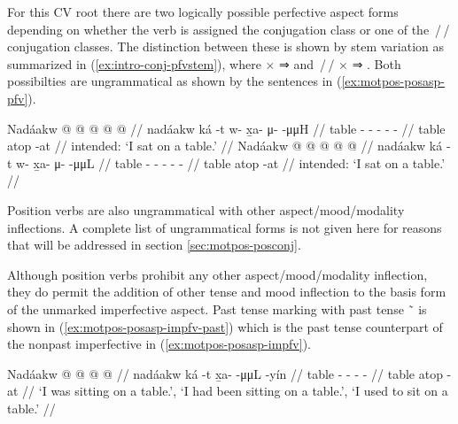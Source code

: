 \documentclass[12pt,letterpaper,oneside,article]{memoir}
\begin{document}
For this CV root there are two logically possible perfective aspect forms depending on whether the verb is assigned the  conjugation class or one of the \,/\,/ conjugation classes.
The distinction between these is shown by stem variation as summarized in (\ref{ex:intro-conj-pfvstem}), where  ×  ⇒  and \,/\,/ ×  ⇒ .
Both possibilties are ungrammatical as shown by the sentences in (\ref{ex:motpos-posasp-pfv}).

\pex\label{ex:motpos-posasp-pfv}%
\a\label{ex:motpos-posasp-pfv-nonz}%
\ljudge{*}%
%
\begingl
	\gla	Nadáakw  @ {}  @ {} @ {} @ {} @ {} //
	\glb	nadáakw ká -t
		w- x̱a- μ-  -μμH //
	\glc	table  -
		- - -  - //
	\gld	table atop -at
		 {} {} {} {} //
	\glft	intended: ‘I sat on a table.’
		//
\endgl
\a\label{ex:motpos-posasp-pfv-nonz}%
\ljudge{*}%
%
\begingl
	\gla	Nadáakw  @ {}  @ {} @ {} @ {} @ {} //
	\glb	nadáakw ká -t
		w- x̱a- μ-  -μμL //
	\glc	table  -
		- - -  - //
	\gld	table atop -at
		 {} {} {} {} //
	\glft	intended: ‘I sat on a table.’
		//
\endgl
\xe

Position verbs are also ungrammatical with other aspect/mood/modality inflections.
A complete list of ungrammatical forms is not given here for reasons that will be addressed in section \ref{sec:motpos-posconj}.

Although position verbs prohibit any other aspect/mood/modality inflection, they do permit the addition of other tense and mood inflection to the basis form of the unmarked imperfective aspect.
Past tense marking with past tense  \~\  is shown in (\ref{ex:motpos-posasp-impfv-past}) which is the past tense counterpart of the nonpast imperfective in (\ref{ex:motpos-posasp-impfv}).

\ex\label{ex:motpos-posasp-impfv-past}%
%
\begingl
	\gla	Nadáakw  @ {}  @ {} @ {} @ {} //
	\glb	nadáakw ká -t x̱a-  -μμL -yín //
	\glc	table  - -  - - //
	\gld	table atop -at  {} {} {} //
	\glft	‘I was sitting on a table.’, ‘I had been sitting on a table.’, ‘I used to sit on a table.’
		//
\endgl
\xe
\end{document}
